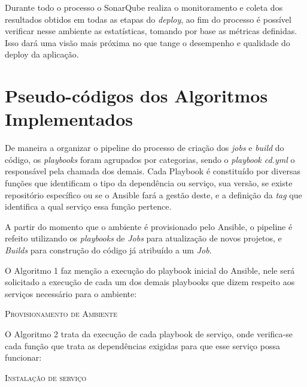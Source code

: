 Durante todo o processo o SonarQube realiza o monitoramento e coleta dos resultados obtidos em todas as etapas do \textit{deploy}, ao fim do processo é possível verificar nesse ambiente as estatísticas, tomando por base as métricas definidas. Isso dará uma visão mais próxima no que tange o desempenho e qualidade do deploy da aplicação.

\section{Pseudo-códigos dos Algoritmos Implementados}

De maneira a organizar o pipeline do processo de criação dos \textit{jobs }e \textit{build} do código, os \textit{playbooks} foram agrupados por categorias, sendo o \textit{playbook cd.yml} o responsável pela chamada dos demais. Cada Playbook é constituído por diversas funções que identificam o tipo da dependência ou serviço, sua versão, se existe repositório específico ou se o Ansible fará a gestão deste, e a definição da \textit{tag} que identifica a qual serviço essa função pertence.

A partir do momento que o ambiente é provisionado pelo Ansible, o pipeline é refeito utilizando os \textit{playbooks} de \textit{Jobs} para atualização de novos projetos, e \textit{Builds} para construção do código já atribuído a um \textit{Job}.

    \vspace*{2cm}
O Algoritmo 1 faz menção a execução do playbook inicial do Ansible, nele será solicitado a execução de cada um dos demais playbooks que dizem respeito aos serviços necessário para o ambiente:

\begin{algorithm}[H]
	\SetAlgoLined
	\label{alg:algoritmo01}
	\caption{\textsc{Provisionamento de Ambiente}}
\end{algorithm}
\newpage 
O Algoritmo 2 trata da execução de cada playbook de serviço, onde verifica-se cada função que trata as dependências exigidas para que esse serviço possa funcionar:

\begin{algorithm}[H]
	\SetAlgoLined
	
	
	\label{alg:algoritmo02}
	\caption{\textsc{Instalação de serviço}}
\end{algorithm}

